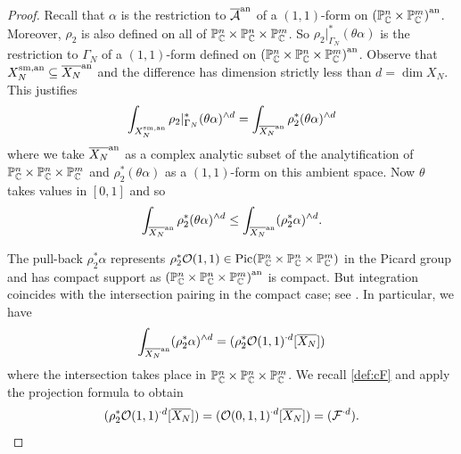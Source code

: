\begin{proof}
Recall that $\alpha$ is the restriction to ${\overline{\mathcal{A}}}^{\mathrm{an}}$ 
of a  $(1,1)$-form on  
${({\mathbb{P}}^n_{{\mathbb{C}}}\times{\mathbb{P}}^m_{{\mathbb{C}}})}^{\mathrm{an}}$.
Moreover,
$\rho_2$ is also defined on all of ${\mathbb{P}}^n_{{\mathbb{C}}} \times{\mathbb{P}}^n_{{\mathbb{C}}}\times {\mathbb{P}}^m_{{\mathbb{C}}}$. So ${\rho_2}|_{\Gamma_N}^*(\theta\alpha)$ is the restriction to
$\Gamma_N$ of a $(1,1)$-form defined on ${({\mathbb{P}}^n_{{\mathbb{C}}} \times{\mathbb{P}}^n_{{\mathbb{C}}}\times {\mathbb{P}}^m_{{\mathbb{C}}})}^{\mathrm{an}}$. 
Observe that ${X}^{\mathrm{sm,an}}_N\subseteq {\overline{X_N}}^{\mathrm{an}}$ and the difference has
dimension strictly less than $d=\dim X_N$.
This justifies%
\begin{equation}
\label{eq:chain3}   
  \int_{{X}^{\mathrm{sm,an}}_N} \rho_2|_{\Gamma_N}^*(\theta\alpha)^{\wedge d}
  =\int_{{\overline{X_N}}^{\mathrm{an}}} \rho_2^*(\theta\alpha)^{\wedge d}
\end{equation}
where we take ${\overline{X_N}}^{\mathrm{an}}$ as a complex analytic subset of
the analytification of ${\mathbb{P}}_{{\mathbb{C}}}^n\times{\mathbb{P}}_{{\mathbb{C}}}^n\times {\mathbb{P}}_{{\mathbb{C}}}^m$ and $\rho_2^*(\theta\alpha)$ as a
$(1,1)$-form on this ambient space.
Now $\theta$ takes values in $[0,1]$ and so
\begin{equation}
\label{eq:chain4}
\int_{{\overline{X_N}}^{\mathrm{an}}} \rho_2^*(\theta\alpha)^{\wedge d}\le
  \int_{{\overline{X_N}}^{\mathrm{an}}} (\rho_2^*\alpha)^{\wedge d}.
\end{equation}


The pull-back $\rho_2^*\alpha$ represents
$\rho_2^* {\mathcal O}(1,1) \in
\mathrm{Pic}({\mathbb{P}}_{{\mathbb{C}}}^n\times{\mathbb{P}}_{{\mathbb{C}}}^n\times{\mathbb{P}}_{{\mathbb{C}}}^m)$ in the
Picard group and
has compact support as ${({\mathbb{P}}_{{\mathbb{C}}}^n\times{\mathbb{P}}_{{\mathbb{C}}}^n\times {\mathbb{P}}_{{\mathbb{C}}}^m)}^{\mathrm{an}}$ is
compact.
But integration coincides with the intersection pairing in the compact
case; see \cite[Theorem~11.21]{voisin:hodge1}. In particular, we have
\begin{equation}
\label{eq:chain5} 
\int_{\an{\overline{X_N}}} (\rho_2^*\alpha)^{\wedge d} = (\rho_2^*
\cO(1,1)^{\cdot d} [\overline {X_N}]) %
\end{equation}
where the intersection takes place in
${\mathbb{P}}_{{\mathbb{C}}}^n\times{\mathbb{P}}_{{\mathbb{C}}}^n\times{\mathbb{P}}_{{\mathbb{C}}}^m$. We recall \eqref{def:cF}
and apply  the projection formula to obtain 
\begin{equation}
\label{eq:chain6}  
  (\rho_2^*
{\mathcal O}(1,1)^{\cdot d}  [\overline {X_N}]) = ({\mathcal O}(0,1,1)^{\cdot d}  [\overline {X_N}]) =  ({\mathcal F}^{\cdot d}).
\end{equation}


\end{proof}
